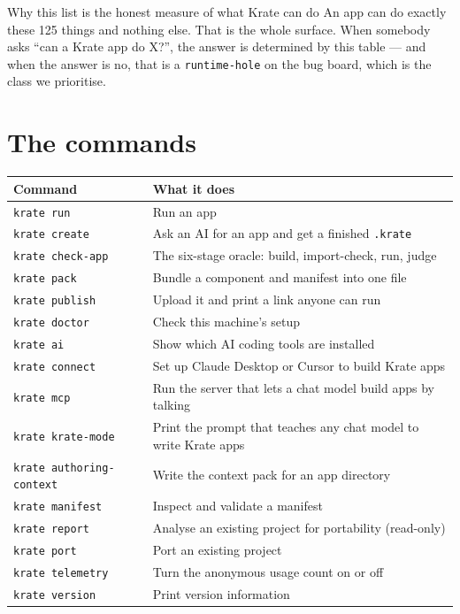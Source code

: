 \documentclass[11pt,a4paper]{report}
\begin{document}
\begin{plainbox}{Why this list is the honest measure of what Krate can do}
An app can do exactly these 125 things and nothing else. That is the whole
surface. When somebody asks ``can a Krate app do X?'', the answer is
determined by this table --- and when the answer is no, that is a
\texttt{runtime-hole} on the bug board, which is the class we prioritise.
\end{plainbox}

\section{The commands}

\begin{center}
\begin{longtable}{lp{9.4cm}}
\toprule
\textbf{Command} & \textbf{What it does} \\
\midrule
\endhead
\texttt{krate run} & Run an app \\
\texttt{krate create} & Ask an AI for an app and get a finished \texttt{.krate} \\
\texttt{krate check-app} & The six-stage oracle: build, import-check, run, judge \\
\texttt{krate pack} & Bundle a component and manifest into one file \\
\texttt{krate publish} & Upload it and print a link anyone can run \\
\texttt{krate doctor} & Check this machine's setup \\
\texttt{krate ai} & Show which AI coding tools are installed \\
\texttt{krate connect} & Set up Claude Desktop or Cursor to build Krate apps \\
\texttt{krate mcp} & Run the server that lets a chat model build apps by talking \\
\texttt{krate krate-mode} & Print the prompt that teaches any chat model to write Krate apps \\
\texttt{krate authoring-context} & Write the context pack for an app directory \\
\texttt{krate manifest} & Inspect and validate a manifest \\
\texttt{krate report} & Analyse an existing project for portability (read-only) \\
\texttt{krate port} & Port an existing project \\
\texttt{krate telemetry} & Turn the anonymous usage count on or off \\
\texttt{krate version} & Print version information \\
\bottomrule
\end{longtable}
\end{center}
\end{document}

